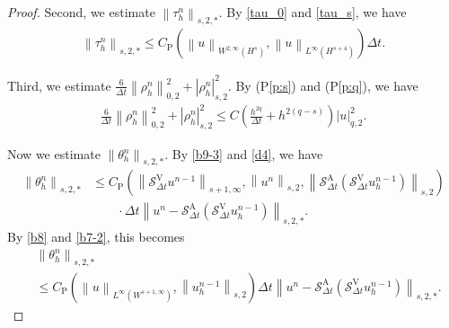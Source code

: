 \documentclass[10pt,a4paper,tbtags,leqno]{amsart}
\theoremstyle{definition}
\numberwithin{equation}{section}
\def\norm#1#2{\left\|#2\right\|_{#1}}
\def\snorm#1#2{\left|#2\right|_{#1}}
\begin{document}
\begin{proof}
  Second, we estimate $ \norm{s, 2, \ast}{\tau_h^n} $. By \eqref{tau_0} and \eqref{tau_s}, we have 
  \begin{align} 
    \norm{s, 2, \ast}{\tau_h^n} \leq C_{\mathrm{P}} (\norm{W^{2, \infty}(H^{s})}{u}, \norm{L^{\infty}(H^{s+4})}{u}) \Delta t. \label{b28}
  \end{align} 

  Third, we estimate $ \frac{6}{\Delta t} \norm{0,2}{\rho_h^n}^2 + \snorm{s,2}{\rho_h^n}^2 $. 
  By (P\ref{p:s}) and (P\ref{p:q}), we have 
  \begin{align}
    \frac{6}{\Delta t} \norm{0, 2}{\rho_h^n}^2 + \snorm{s, 2}{\rho_h^n}^2 \leq C\left(\frac{h^{2q}}{\Delta t} + h^{2 (q - s)}\right)\snorm{q, 2}{u}^2. \label{b31}
  \end{align}

  Now we estimate $ \norm{s, 2, \ast}{\theta_h^n} $. By \eqref{b9-3} and \eqref{d4}, we have 
  \begin{align} 
    \norm{s, 2, \ast}{\theta_h^n} 
    & \leq C_{\mathrm{P}} (\norm{s + 1, \infty}{\mathcal{S}_{\Delta t}^{\mathrm{V}} u^{n - 1}}, \norm{s, 2}{u^n}, \norm{s, 2}{\mathcal{S}_{\Delta t}^{\mathrm{A}} (\mathcal{S}_{\Delta t}^{\mathrm{V}} u_h^{n - 1})}) \\ & \qquad \cdot \Delta t
    \norm{s, 2, \ast}{u^n - \mathcal{S}_{\Delta t}^{\mathrm{A}} (\mathcal{S}_{\Delta t}^{\mathrm{V}} u_h^{n - 1})}. \label{b10-4} 
  \end{align} 
  By \eqref{b8} and \eqref{b7-2}, this becomes 
  \begin{align} 
    & \norm{s, 2, \ast}{\theta_h^n} \\ & \leq C_{\mathrm{P}} (\norm{L^\infty (W^{s + 1, \infty})}{u}, \norm{s, 2}{u_h^{n - 1}}) \Delta t \norm{s, 2, \ast}{u^n - \mathcal{S}_{\Delta t}^{\mathrm{A}} (\mathcal{S}_{\Delta t}^{\mathrm{V}} u_h^{n - 1})}.  \label{b10} 
  \end{align} 

\end{proof}
\end{document}

